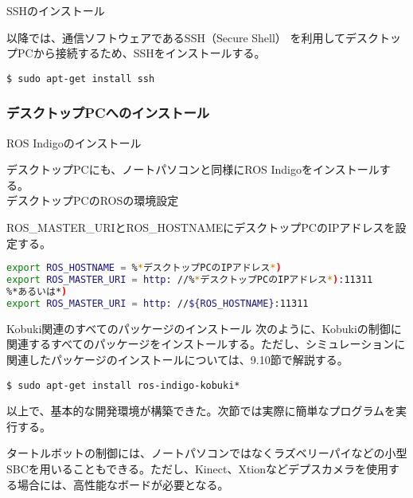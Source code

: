 \circled{\thenum} SSHのインストール

以降では、通信ソフトウェアであるSSH（Secure Shell）  を利用してデスクトップPCから接続するため、SSHをインストールする。\\

\begin{lstlisting}[language=ROS]
$ sudo apt-get install ssh
\end{lstlisting}


\subsubsection{デスクトップPCへのインストール}

\setcounter{num}{0}

\circled{\thenum} ROS Indigoのインストール

デスクトップPCにも、ノートパソコンと同様にROS Indigoをインストールする。\\

\circled{\thenum} デスクトップPCのROSの環境設定

ROS\_MASTER\_URIとROS\_HOSTNAMEにデスクトップPCのIPアドレスを設定する。\\

\begin{lstlisting}[language=bash]
export ROS_HOSTNAME = %*デスクトップPCのIPアドレス*)
export ROS_MASTER_URI = http: //%*デスクトップPCのIPアドレス*):11311
%*あるいは*)
export ROS_MASTER_URI = http: //${ROS_HOSTNAME}:11311
\end{lstlisting}

\circled{\thenum} Kobuki関連のすべてのパッケージのインストール
次のように、Kobukiの制御に関連するすべてのパッケージをインストールする。ただし、シミュレーションに関連したパッケージのインストールについては、9.10節で解説する。\\

\begin{lstlisting}[language=ROS]
$ sudo apt-get install ros-indigo-kobuki*
\end{lstlisting}

以上で、基本的な開発環境が構築できた。次節では実際に簡単なプログラムを実行する。\\

\begin{exercise}
タートルボットの制御には、ノートパソコンではなくラズベリーパイなどの小型SBCを用いることもできる。ただし、Kinect、Xtionなどデプスカメラを使用する場合には、高性能なボードが必要となる。
\end{exercise}

